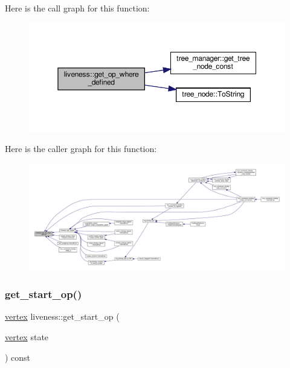Here is the call graph for this function\+:
\nopagebreak
\begin{figure}[H]
\begin{center}
\leavevmode
\includegraphics[width=350pt]{d3/d1f/classliveness_a14a41c047ba1373429e2eb1197fe692a_cgraph}
\end{center}
\end{figure}
Here is the caller graph for this function\+:
\nopagebreak
\begin{figure}[H]
\begin{center}
\leavevmode
\includegraphics[width=350pt]{d3/d1f/classliveness_a14a41c047ba1373429e2eb1197fe692a_icgraph}
\end{center}
\end{figure}
\mbox{\label{classliveness_ad5809b83204b0da9292fae80d9730139}} 
\subsubsection{\texorpdfstring{get\+\_\+start\+\_\+op()}{get\_start\_op()}}
{\footnotesize\ttfamily \hyperlink{graph_8hpp_abefdcf0544e601805af44eca032cca14}{vertex} liveness\+::get\+\_\+start\+\_\+op (\begin{DoxyParamCaption}\item[{\hyperlink{graph_8hpp_abefdcf0544e601805af44eca032cca14}{vertex}}]{state }\end{DoxyParamCaption}) const}



